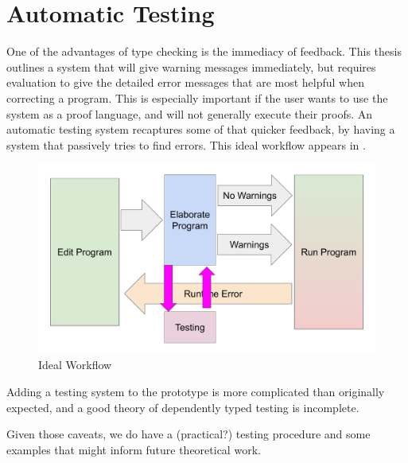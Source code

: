 \section{Automatic Testing}

One of the advantages of type checking is the immediacy of feedback.
This thesis outlines a system that will give warning messages immediately, but requires evaluation to give the detailed error messages that are most helpful when correcting a program.
This is especially important if the user wants to use the system as a proof language, and will not generally execute their proofs.
An automatic testing system recaptures some of that quicker feedback, by having a system that passively tries to find errors.
This ideal workflow appears in .


\begin{figure}
\includegraphics[width=5in]{fig/best-workflow.pdf}
\caption{Ideal Workflow}
\label{fig:notes-workflow}
\end{figure}
 
Adding a testing system to the prototype is more complicated than originally expected, and a good theory of dependently typed testing is incomplete.
 
Given those caveats, we do have a (practical?) testing procedure and some examples that might inform future theoretical work. 
 
